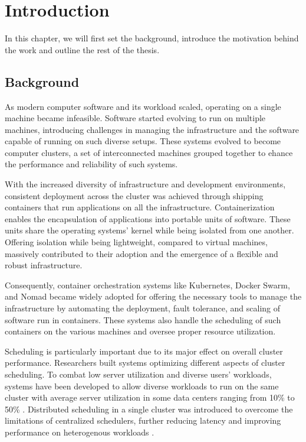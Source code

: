 
\chapter{Introduction} 

In this chapter, we will first set the background, introduce the motivation
behind the work and outline the rest of the thesis.  

\section{Background}
As modern computer software and its workload scaled, operating on a single
machine became infeasible. Software started evolving to run on multiple
machines, introducing challenges in managing the infrastructure and the
software capable of running on such diverse setups. These systems evolved to
become computer clusters, a set of interconnected machines grouped together to
ehance the performance and reliability of such systems. 

With the increased diversity of infrastructure and development environments,
consistent deployment across the cluster was achieved through shipping
containers that run applications on all the infrastructure. Containerization
enables the encapsulation of applications into portable units of software.
These units share the operating systems' kernel while being isolated from one
another. Offering isolation while being lightweight, compared to virtual
machines, massively contributed to their adoption and the emergence of a flexible
and robust infrastructure. 

Consequently, container orchestration systems like Kubernetes, Docker Swarm,
and Nomad \cite{noauthor_swarm_0100, verma_large-scale_2015,
noauthor_multi-region_nodate} became widely adopted for offering the necessary
tools to manage the infrastructure by automating the deployment, fault
tolerance, and scaling of software run in containers. These systems also handle
the scheduling of such containers on the various machines and oversee proper
resource utilization.  

Scheduling is particularly important due to its major effect on overall cluster
performance. Researchers built systems optimizing different aspects of cluster
scheduling. To combat low server utilization and diverse users' workloads,
systems have been developed to allow diverse workloads to run on the same
cluster \cite{bhattacharya_hierarchical_2013, hindman_mesos_nodate} with
average server utilization in some data centers ranging from 10\% to 50\%
\cite{lo_heracles_2015}. Distributed scheduling in a single cluster was
introduced to overcome the limitations of centralized schedulers, further
reducing latency and improving performance on heterogenous workloads
\cite{schwarzkopf_omega_2013, boutin_apollo_2014}. 

